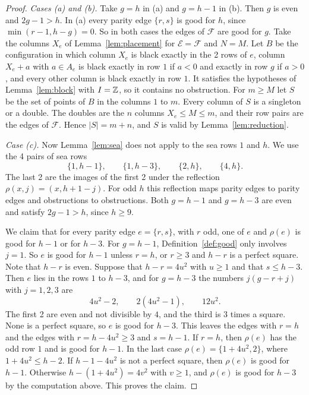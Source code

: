 \begin{proof}
\emph{Cases (a) and (b).} Take $g=h$ in (a) and $g=h-1$ in (b). Then $g$ is even and
$2g-1>h$. In (a) every parity edge $\{r,s\}$ is good for $h$, since $\min(r-1,h-g)=0$. So
in both cases the edges of $\mathcal F$ are good for $g$. Take the columns $X_e$ of
Lemma~\ref{lem:placement} for $\mathcal E=\mathcal F$ and $N=M$. Let $B$ be the
configuration in which column $X_e$ is black exactly in the 2 rows of $e$, column $X_e+a$
with $a\in A_e$ is black exactly in row $1$ if $a<0$ and exactly in row $g$ if $a>0$, and
every other column is black exactly in row $1$. It satisfies the hypotheses of
Lemma~\ref{lem:block} with $I=\mathbb{Z}$, so it contains no obstruction. For $m\ge M$ let $S$ be
the set of points of $B$ in the columns $1$ to $m$. Every column of $S$ is a singleton or
a double. The doubles are the $n$ columns $X_e\le M\le m$, and their row pairs are the
edges of $\mathcal F$. Hence $|S|=m+n$, and $S$ is valid by Lemma~\ref{lem:reduction}.

\emph{Case (c).} Now Lemma~\ref{lem:sea} does not apply to the sea rows $1$ and $h$. We
use the 4 pairs of sea rows
\[
 \{1,h-1\},\qquad\{1,h-3\},\qquad\{2,h\},\qquad\{4,h\}.
\]
The last 2 are the images of the first 2 under the reflection $\rho(x,j)=(x,h+1-j)$. For
odd $h$ this reflection maps parity edges to parity edges and obstructions to
obstructions. Both $g=h-1$ and $g=h-3$ are even and satisfy $2g-1>h$, since $h\ge9$.

We claim that for every parity edge $e=\{r,s\}$, with $r$ odd, one of $e$ and $\rho(e)$ is
good for $h-1$ or for $h-3$. For $g=h-1$, Definition~\ref{def:good} only involves $j=1$.
So $e$ is good for $h-1$ unless $r=h$, or $r\ge3$ and $h-r$ is a perfect square. Note that
$h-r$ is even. Suppose that $h-r=4u^2$ with $u\ge1$ and that $s\le h-3$. Then $e$ lies in
the rows $1$ to $h-3$, and for $g=h-3$ the numbers $j(g-r+j)$ with $j=1,2,3$ are
\[
 4u^2-2,\qquad 2(4u^2-1),\qquad 12u^2 .
\]
The first 2 are even and not divisible by $4$, and the third is 3 times a square. None is a
perfect square, so $e$ is good for $h-3$. This leaves the edges with $r=h$ and the edges
with $r=h-4u^2\ge3$ and $s=h-1$. If $r=h$, then $\rho(e)$ has the odd row $1$ and is good
for $h-1$. In the last case $\rho(e)=\{1+4u^2,2\}$, where $1+4u^2\le h-2$. If $h-1-4u^2$ is
not a perfect square, then $\rho(e)$ is good for $h-1$. Otherwise $h-(1+4u^2)=4v^2$ with
$v\ge1$, and $\rho(e)$ is good for $h-3$ by the computation above. This proves the claim.


\end{proof}

